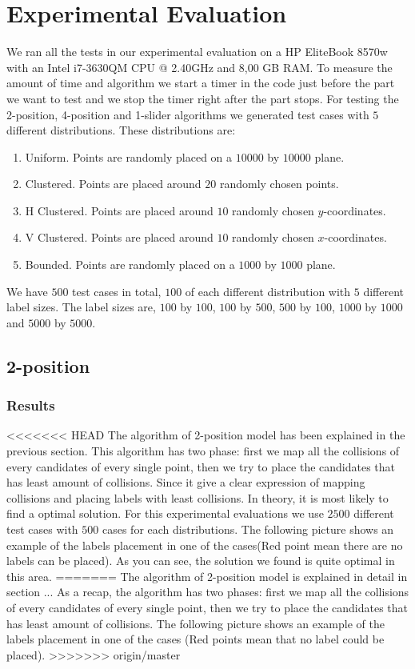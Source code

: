 \documentclass[crop=false,a4paper,oneside,11pt]{standalone}
\begin{document}
\section{Experimental Evaluation}

We ran all the tests in our experimental evaluation on a HP EliteBook 8570w with an Intel i7-3630QM CPU @ 2.40GHz and 8,00 GB RAM. To measure the amount of time and algorithm we start a timer in the code just before the part we want to test and we stop the timer right after the part stops. For testing the 2-position, 4-position and 1-slider algorithms we generated test cases with $5$ different distributions. These distributions are:
\begin{enumerate}
    \item Uniform. Points are randomly placed on a $10000$ by $10000$ plane.
    \item Clustered. Points are placed around $20$ randomly chosen points.
    \item H Clustered. Points are placed around $10$ randomly chosen $y$-coordinates.
    \item V Clustered. Points are placed around $10$ randomly chosen $x$-coordinates.
    \item Bounded. Points are randomly placed on a $1000$ by $1000$ plane.
\end{enumerate}
We have $500$ test cases in total, $100$ of each different distribution with $5$ different label sizes. The label sizes are, $100$ by $100$, $100$ by $500$, $500$ by $100$, $1000$ by $1000$ and $5000$ by $5000$.

\subsection{2-position}
\subsubsection{Results}
<<<<<<< HEAD
The algorithm of 2-position model has been explained in the previous section. This algorithm has two phase: first we map all the collisions of every candidates of every single point, then we try to place the candidates that has least amount of collisions. Since it give a clear expression of mapping collisions and placing labels with least collisions. In theory, it is most likely to find a optimal solution. For this experimental evaluations we use $2500$ different test cases with $500$ cases for each distributions. The following picture shows an example of the labels placement in one of the cases(Red point mean there are no labels can be placed). As you can see, the solution we found is quite optimal in this area.
=======
The algorithm of 2-position model is explained in detail in section ... As a recap, the algorithm has two phases: first we map all the collisions of every candidates of every single point, then we try to place the candidates that has least amount of collisions. The following picture shows an example of the labels placement in one of the cases (Red points mean that no label could be placed).
>>>>>>> origin/master
\end{document}
